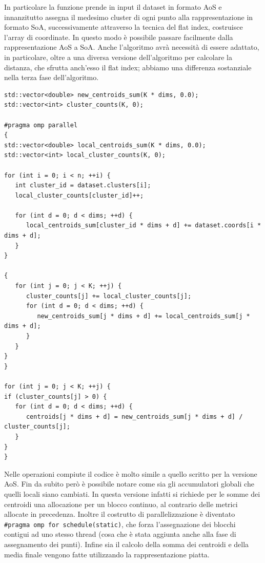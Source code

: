 \documentclass[10pt,twocolumn,letterpaper]{article}
\begin{document}
In particolare la funzione prende in input il dataset in formato AoS e innanzitutto assegna il medesimo cluster di ogni punto alla rappresentazione in formato SoA, successivamente attraverso la tecnica del flat index, costruisce l'array di coordinate. In questo modo è possibile passare facilmente dalla rappresentazione AoS a SoA. Anche l'algoritmo avrà necessità di essere adattato, in particolare, oltre a una diversa versione dell'algoritmo per calcolare la distanza, che sfrutta anch'esso il flat index; abbiamo una differenza sostanziale nella terza fase dell'algoritmo.

\begin{lstlisting}[caption={Fase di aggioramento dei centroidi SoA}, label={lst:openmp}]
std::vector<double> new_centroids_sum(K * dims, 0.0);
std::vector<int> cluster_counts(K, 0);

#pragma omp parallel
{
std::vector<double> local_centroids_sum(K * dims, 0.0);
std::vector<int> local_cluster_counts(K, 0);

for (int i = 0; i < n; ++i) {
   int cluster_id = dataset.clusters[i];
   local_cluster_counts[cluster_id]++;
   
   for (int d = 0; d < dims; ++d) {
      local_centroids_sum[cluster_id * dims + d] += dataset.coords[i * dims + d];
   }
}

{
   for (int j = 0; j < K; ++j) {
      cluster_counts[j] += local_cluster_counts[j];
      for (int d = 0; d < dims; ++d) {
         new_centroids_sum[j * dims + d] += local_centroids_sum[j * dims + d];
      }
   }
}
} 

for (int j = 0; j < K; ++j) {
if (cluster_counts[j] > 0) {
   for (int d = 0; d < dims; ++d) {
      centroids[j * dims + d] = new_centroids_sum[j * dims + d] / cluster_counts[j];
   }
}
}
\end{lstlisting}

Nelle operazioni compiute il codice è molto simile a quello scritto per la versione AoS. Fin da subito però è possibile notare come sia gli accumulatori globali che quelli locali siano cambiati. In questa versione infatti si richiede per le somme dei centroidi una allocazione per un blocco continuo, al contrario delle metrici allocate in precedenza. Inoltre il costrutto di parallelizzazione è diventato \lstinline{#pragma omp for schedule(static)}, che forza l'assegnazione dei blocchi contigui ad uno stesso thread (cosa che è stata aggiunta anche alla fase di assegnamento dei punti). Infine sia il calcolo della somma dei centroidi e della media finale vengono fatte utilizzando la rappresentazione piatta.
\end{document}
